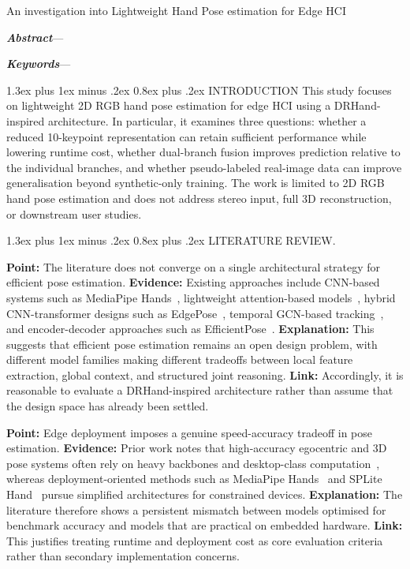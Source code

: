 \documentclass[10pt,letterpaper]{article}
\makeatletter
\renewcommand\section{\@startsection{section}{1}{\z@}%
  {1.3ex plus 1ex minus .2ex}%
  {0.8ex plus .2ex}%
  {\centering\normalfont\small\scshape}}
\makeatother
\begin{document}
\begin{center}
{\LARGE An investigation into Lightweight Hand Pose estimation for Edge HCI\par}
\end{center}

\vspace{0.6em}
\noindent\textbf{\textit{Abstract}}---

\vspace{0.6em}
\noindent\textbf{\textit{Keywords}}---

\section{INTRODUCTION}
This study focuses on lightweight 2D RGB hand pose estimation for edge HCI using a DRHand-inspired architecture. In particular, it examines three questions: whether a reduced 10-keypoint representation can retain sufficient performance while lowering runtime cost, whether dual-branch fusion improves prediction relative to the individual branches, and whether pseudo-labeled real-image data can improve generalisation beyond synthetic-only training. The work is limited to 2D RGB hand pose estimation and does not address stereo input, full 3D reconstruction, or downstream user studies.

\section{LITERATURE REVIEW}.

\medskip
\noindent\textbf{Point:} The literature does not converge on a single architectural strategy for efficient pose estimation.  
\textbf{Evidence:} Existing approaches include CNN-based systems such as MediaPipe Hands~\cite{mediapipe}, lightweight attention-based models~\cite{attentionlite}, hybrid CNN-transformer designs such as EdgePose~\cite{edgepose}, temporal GCN-based tracking~\cite{handobjectgcn}, and encoder-decoder approaches such as EfficientPose~\cite{efficientpose}.  
\textbf{Explanation:} This suggests that efficient pose estimation remains an open design problem, with different model families making different tradeoffs between local feature extraction, global context, and structured joint reasoning.  
\textbf{Link:} Accordingly, it is reasonable to evaluate a DRHand-inspired architecture rather than assume that the design space has already been settled.

\medskip
\noindent\textbf{Point:} Edge deployment imposes a genuine speed-accuracy tradeoff in pose estimation.  
\textbf{Evidence:} Prior work notes that high-accuracy egocentric and 3D pose systems often rely on heavy backbones and desktop-class computation~\cite{everydayegohands}, whereas deployment-oriented methods such as MediaPipe Hands~\cite{mediapipe} and SPLite Hand~\cite{splitehand} pursue simplified architectures for constrained devices.  
\textbf{Explanation:} The literature therefore shows a persistent mismatch between models optimised for benchmark accuracy and models that are practical on embedded hardware.  
\textbf{Link:} This justifies treating runtime and deployment cost as core evaluation criteria rather than secondary implementation concerns.
\end{document}
